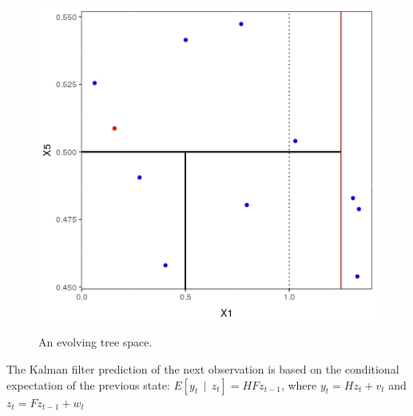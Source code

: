 \documentclass[a1paper,portrait, fontscale=0.45]{baposter}
\DeclareMathOperator{\giv}{\, | \,}
\begin{document}
\begin{poster}
{\begin{figure}[H]
\begin{minipage}[c]{0.42\linewidth}
\includegraphics[width=\linewidth]{tree2.jpeg}
\label{fig:xparts2}
\end{minipage}
\vspace{-1em}
\caption{An evolving tree space.}
\end{figure}

\small{The Kalman filter prediction of the next observation is based on the conditional expectation of the previous state: $E[y_t \giv z_t] = HFz_{t-1}$, where $y_t = Hz_t + v_t$ and $z_t = Fz_{t-1} + w_t$}\\

}
\end{poster}
\end{document}

